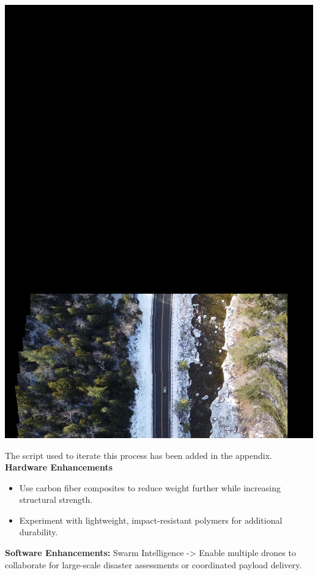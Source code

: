\documentclass[12pt]{report}
\begin{document}
      \begin{minipage}{0.3\textwidth}
        \centering
        \includegraphics[width=\linewidth]{road.mp4.jpg}
    \end{minipage}%
    
    \vspace{0.5cm}
    The script used to iterate this process has been added in the appendix. \\

    \noindent \textbf{Hardware Enhancements}
    \begin{itemize}
      \item Use carbon fiber composites to reduce weight further while increasing structural strength.
      \item Experiment with lightweight, impact-resistant polymers for additional durability.
    \end{itemize}
    \noindent \textbf{Software Enhancements:} Swarm Intelligence -> Enable multiple drones to collaborate for large-scale disaster assessments or coordinated payload delivery. \\ 
\end{document}
